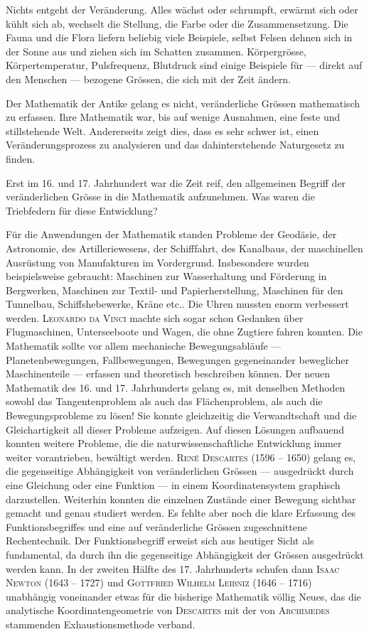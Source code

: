 \documentclass[%
11pt,%
twoside,%
titlepage,%
german,%
headsepline%
]{scrartcl}
\begin{document}
Nichts entgeht der Ver\"anderung. Alles w\"achst oder schrumpft, erw\"armt sich oder k\"uhlt sich ab, wechselt die Stellung, die Farbe oder die Zusammensetzung. Die Fauna und die Flora liefern beliebig viele Beispiele, selbst Felsen dehnen sich in der Sonne aus und ziehen sich im Schatten zusammen. K\"orpergr\"osse, K\"orpertemperatur, Pulsfrequenz, Blutdruck sind einige Beispiele f\"ur --- direkt auf den Menschen --- bezogene Gr\"ossen, die sich mit der Zeit \"andern.

Der Mathematik der Antike gelang es nicht, ver\"anderliche Gr\"ossen mathematisch zu erfassen. Ihre Mathematik war, bis auf wenige Ausnahmen, eine feste und stillstehende Welt. Andererseits zeigt dies, dass es sehr schwer ist, einen Ver\"anderungsprozess zu analysieren und das dahinterstehende Naturgesetz zu finden.

Erst im 16. und 17. Jahrhundert war die Zeit reif, den allgemeinen Begriff der ver\"anderlichen Gr\"osse in die Mathematik aufzunehmen.
Was waren die Triebfedern f\"ur diese Entwicklung?

F\"ur die Anwendungen der Mathematik standen Probleme der Geod\"asie, der Astronomie, des Artilleriewesens, der Schifffahrt, des Kanalbaus, der maschinellen Ausr\"ustung von Manufakturen im Vordergrund. Insbesondere wurden beispielsweise gebraucht: Maschinen zur Wasserhaltung und F\"orderung in Bergwerken, Maschinen zur Textil- und Papierherstellung, Maschinen f\"ur den Tunnelbau, Schiffshebewerke, Kr\"ane etc.. Die Uhren mussten enorm verbessert werden. \textsc{Leonardo da Vinci} machte sich sogar schon Gedanken \"uber Flugmaschinen, Unterseeboote und Wagen, die ohne Zugtiere fahren konnten.
Die Mathematik sollte vor allem mechanische Bewegungsabl\"aufe --- Planetenbewegungen, Fallbewegungen, Bewegungen gegeneinander beweglicher Maschinenteile --- erfassen und theoretisch beschreiben k\"onnen.
Der neuen Mathematik des 16. und 17. Jahrhunderts gelang es, mit denselben Methoden sowohl das Tangentenproblem als auch das Fl\"achenproblem, als auch die Bewegungsprobleme zu l\"osen! Sie konnte gleichzeitig die Verwandtschaft und die Gleichartigkeit all dieser Probleme aufzeigen. Auf diesen L\"osungen aufbauend konnten weitere Probleme, die die naturwissenschaftliche Entwicklung immer weiter vorantrieben, bew\"altigt werden.
\textsc{Ren\'e Descartes} (1596 -- 1650) gelang es, die gegenseitige Abh\"angigkeit von ver\"anderlichen Gr\"ossen --- ausgedr\"uckt durch eine Gleichung oder eine Funk\-tion --- in einem Koordinatensystem graphisch darzustellen.
Weiterhin konnten die einzelnen Zust\"ande einer Bewegung sichtbar gemacht und genau studiert werden.
Es fehlte aber noch die klare Erfassung des Funk\-tions\-begriffes und eine auf ver\"anderliche Gr\"ossen zugeschnittene Rechentechnik. Der Funktionsbegriff erweist sich aus heutiger Sicht als fundamental, da durch ihn die gegenseitige Abh\"angigkeit der Gr\"ossen ausgedr\"uckt werden kann.
In der zweiten H\"alfte des 17. Jahrhunderts schufen dann \textsc{Isaac Newton} (1643 -- 1727) und \textsc{Gottfried Wilhelm Leibniz} (1646 -- 1716) unabh\"angig voneinander etwas f\"ur die bisherige Mathematik v\"ollig Neues, das die analytische Koordinatengeometrie von \textsc{Descartes} mit der von \textsc{Archimedes} stammenden Exhaustionsmethode verband.
\end{document}
